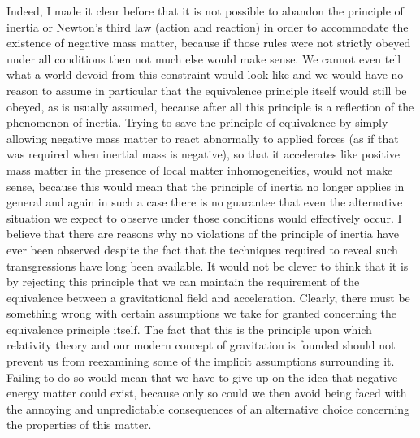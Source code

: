 \documentclass[notitlepage,12pt]{report}
\begin{document}
Indeed, I made it clear before that it is not possible to abandon the principle of inertia or Newton's third law (action and reaction) in order to accommodate the existence of negative mass matter, because if those rules were not strictly obeyed under all conditions then not much else would make sense. We cannot even tell what a world devoid from this constraint would look like and we would have no reason to assume in particular that the equivalence principle itself would still be obeyed, as is usually assumed, because after all this principle is a reflection of the phenomenon of inertia. Trying to save the principle of equivalence by simply allowing negative mass matter to react abnormally to applied forces (as if that was required when inertial mass is negative), so that it accelerates like positive mass matter in the presence of local matter inhomogeneities, would not make sense, because this would mean that the principle of inertia no longer applies in general and again in such a case there is no guarantee that even the alternative situation we expect to observe under those conditions would effectively occur. I believe that there are reasons why no violations of the principle of inertia have ever been observed despite the fact that the techniques required to reveal such transgressions have long been available. It would not be clever to think that it is by rejecting this principle that we can maintain the requirement of the equivalence between a gravitational field and acceleration. Clearly, there must be something wrong with certain assumptions we take for granted concerning the equivalence principle itself. The fact that this is the principle upon which relativity theory and our modern concept of gravitation is founded should not prevent us from reexamining some of the implicit assumptions surrounding it. Failing to do so would mean that we have to give up on the idea that negative energy matter could exist, because only so could we then avoid being faced with the annoying and unpredictable consequences of an alternative choice concerning the properties of this matter.
\end{document}
